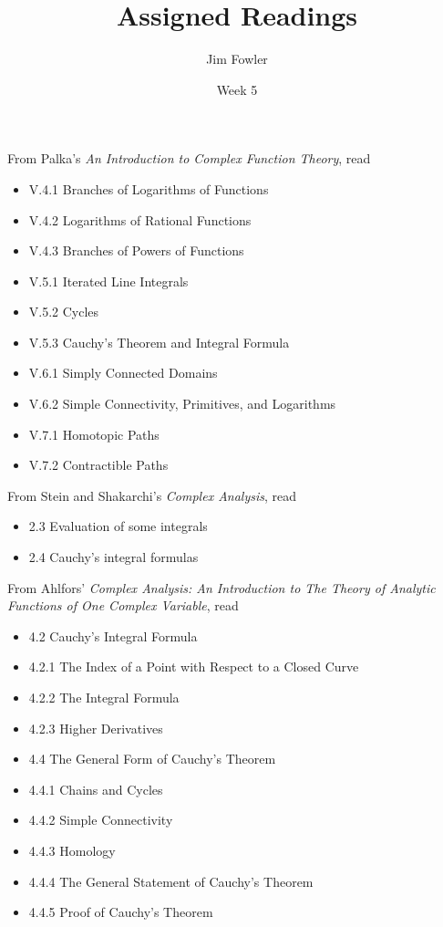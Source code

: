 \documentclass{homework}
\author{Jim Fowler}
\title{Assigned Readings}
\date{Week 5}
\begin{document}
\maketitle


From Palka's \textit{An Introduction to Complex Function Theory}, read
\begin{itemize}
\item V.4.1 Branches of Logarithms of Functions
\item V.4.2 Logarithms of Rational Functions
\item V.4.3 Branches of Powers of Functions
\item V.5.1 Iterated Line Integrals
\item V.5.2 Cycles
\item V.5.3 Cauchy's Theorem and Integral Formula
\item V.6.1 Simply Connected Domains
\item V.6.2 Simple Connectivity, Primitives, and Logarithms
\item V.7.1 Homotopic Paths
\item V.7.2 Contractible Paths
\end{itemize}

From Stein and Shakarchi's \textit{Complex Analysis}, read
\begin{itemize}
\item 2.3 Evaluation of some integrals
\item 2.4 Cauchy's integral formulas
\end{itemize}

From Ahlfors' \textit{Complex Analysis: An Introduction to The Theory of Analytic Functions of One Complex Variable}, read
\begin{itemize}
\item 4.2 Cauchy's Integral Formula
\item 4.2.1 The Index of a Point with Respect to a Closed Curve
\item 4.2.2 The Integral Formula
\item 4.2.3 Higher Derivatives
\item 4.4 The General Form of Cauchy's Theorem
\item 4.4.1 Chains and Cycles
\item 4.4.2 Simple Connectivity
\item 4.4.3 Homology
\item 4.4.4 The General Statement of Cauchy's Theorem
\item 4.4.5 Proof of Cauchy's Theorem
\end{itemize}
\end{document}
